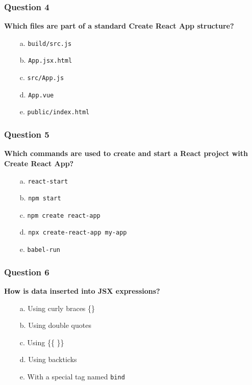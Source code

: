 \documentclass{article}
\newcommand{\cmark}{\textcolor{green}{\ding{51}}} %
\newcommand{\xmark}{\textcolor{red}{\ding{55}}}   %
\begin{document}
\subsubsection*{Question 4}
\textbf{Which files are part of a standard Create React App structure?}

\begin{itemize}
  \item[\xmark\ a.] \texttt{build/src.js}
  \item[\xmark\ b.] \texttt{App.jsx.html}
  \item[\cmark\ c.] \texttt{src/App.js}
  \item[\xmark\ d.] \texttt{App.vue}
  \item[\cmark\ e.] \texttt{public/index.html}
\end{itemize}

\subsubsection*{Question 5}
\textbf{Which commands are used to create and start a React project with Create React App?}

\begin{itemize}
  \item[\xmark\ a.] \texttt{react-start}
  \item[\cmark\ b.] \texttt{npm start}
  \item[\xmark\ c.] \texttt{npm create react-app}
  \item[\cmark\ d.] \texttt{npx create-react-app my-app}
  \item[\xmark\ e.] \texttt{babel-run}
\end{itemize}

\subsubsection*{Question 6}
\textbf{How is data inserted into JSX expressions?}

\begin{itemize}
  \item[\cmark\ a.] Using curly braces \{\}
  \item[\xmark\ b.] Using double quotes
  \item[\xmark\ c.] Using \{\{ \}\}
  \item[\xmark\ d.] Using backticks
  \item[\xmark\ e.] With a special tag named \texttt{bind}
\end{itemize}
\end{document}
